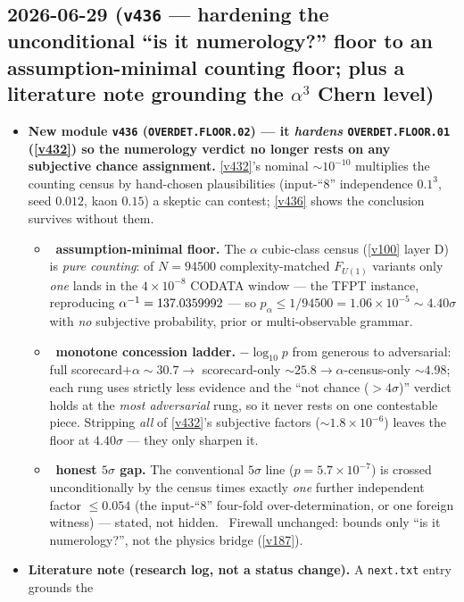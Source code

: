 \subsection*{2026-06-29 (\texttt{v436} --- hardening the unconditional ``is it numerology?'' floor to an assumption-minimal counting floor; plus a literature note grounding the $\alpha^3$ Chern level)}
\begin{itemize}
\item \textbf{New module \texttt{v436} (\texttt{OVERDET.FLOOR.02}) --- it \emph{hardens} \texttt{OVERDET.FLOOR.01}
(\vref{v432}) so the numerology verdict no longer rests on any subjective chance assignment.} \vref{v432}'s
nominal ${\sim}10^{-10}$ multiplies the counting census by hand-chosen plausibilities (input-``$8$''
independence $0.1^3$, seed $0.012$, kaon $0.15$) a skeptic can contest; \vref{v436} shows the conclusion
survives without them.
\begin{itemize}
\item \mE\ \textbf{assumption-minimal floor.} The $\alpha$ cubic-class census (\vref{v100} layer D) is
\emph{pure counting}: of $N=94500$ complexity-matched $F_{U(1)}$ variants only \emph{one} lands in the
$4\times10^{-8}$ CODATA window --- the TFPT instance, reproducing $\alpha^{-1}=137.0359992$ --- so
$p_\alpha\le1/94500=1.06\times10^{-5}\sim4.40\sigma$ with \emph{no} subjective probability, prior or
multi-observable grammar.
\item \mE\ \textbf{monotone concession ladder.} $-\log_{10}p$ from generous to adversarial: full
scorecard$+\alpha\sim30.7\to$ scorecard-only $\sim25.8\to\alpha$-census-only $\sim4.98$; each rung uses
strictly less evidence and the ``not chance ($>4\sigma$)'' verdict holds at the \emph{most adversarial}
rung, so it never rests on one contestable piece. Stripping \emph{all} of \vref{v432}'s subjective factors
($\sim1.8\times10^{-6}$) leaves the floor at $4.40\sigma$ --- they only sharpen it.
\item \mC\ \textbf{honest $5\sigma$ gap.} The conventional $5\sigma$ line ($p=5.7\times10^{-7}$) is crossed
unconditionally by the census times exactly \emph{one} further independent factor $\le0.054$ (the
input-``$8$'' four-fold over-determination, or one foreign witness) --- stated, not hidden. \mC\ Firewall
unchanged: bounds only ``is it numerology?'', not the physics bridge (\vref{v187}).
\end{itemize}
\item \textbf{Literature note (research log, not a status change).} A \texttt{next.txt} entry grounds the

\end{itemize}
